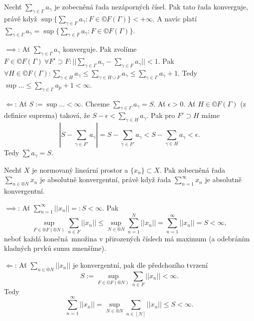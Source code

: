 \documentclass[12pt]{article}					%
\begin{document}
\begin{tvrzeni}
	Nechť $\sum_{\gamma \in \Gamma} a_\gamma$ je zobecněná řada nezáporných čísel. Pak tato řada konverguje, právě když $\sup\{\sum_{\gamma \in F} a_\gamma: F \in ©F(\Gamma)\} < +∞$. A navíc platí $\sum_{\gamma \in \Gamma} a_\gamma = \sup\{\sum_{\gamma \in F} a_\gamma: F \in ©F(\Gamma)\}$.

	\begin{dukazin}
		$\implies$: Ať $\sum_{\gamma \in \Gamma} a_\gamma$ konverguje. Pak zvolíme $F \in ©F(\Gamma)\ \forall F' \supset F: ||\sum_{\gamma \in \Gamma} a_\gamma - \sum_{\gamma \in F} a_\gamma|| < 1$.
		Pak $\forall H \in ©F(\Gamma): \sum_{\gamma \in H} a_\gamma ≤ \sum_{\gamma \in H \cup F} a_\gamma ≤ \sum_{\gamma \in \Gamma}a_\gamma + 1.$ Tedy $\sup… ≤ \sum_{\gamma \in \Gamma} a_p + 1 < ∞$.

		$\Leftarrow$: Ať $S:= \sup… < ∞$. Chceme $\sum_{\gamma \in \Gamma} a_\gamma = S$. Ať $\epsilon > 0$. Ať $H \in ©F(\Gamma)$ (z definice suprema) taková, že $S - \epsilon < \sum_{\gamma \in H} a_\gamma$. Pak pro $F' \supset H$ máme
		$$ |S - \sum_{\gamma \in F'} a_\gamma| = S - \sum_{\gamma \in F'} a_\gamma < S - \sum_{\gamma \in H}a_\gamma < \epsilon. $$
		Tedy $\sum a_\gamma = S$.
	\end{dukazin}
\end{tvrzeni}


\begin{tvrzeni}
	Nechť $X$ je normovaný lineární prostor a $\{x_n\} \subset X$. Pak zobecněná řada $\sum_{n \in ®N}x_n$ je absolutně konvergentní, právě když řada $\sum_{n=1}^∞ x_n$ je absolutně konvergentní.

	\begin{dukazin}
		$\implies$: Ať $\sum_{n=1}^∞ ||x_n|| =: S < ∞$. Pak
		$$ \sup_{F \in ®F(®N)} \sum_{n \in F} ||x_n|| ≤ \sup_{N \in ®N} \sum_{n=1}^N ||x_n|| = \sum_{n=1}^∞ ||x_n|| = S < ∞, $$
		neboť každá konečná množina v přirozených číslech má maximum (a odebráním kladných prvků sumu zmenšíme).

		$\Leftarrow$: Ať $\sum_{n \in ®N} ||x_n||$ je konvergentní, pak dle předchozího tvrzení
		$$ S:=\sup_{F \in ©F(®N)} \sum_{n \in F} ||x_n|| < ∞. $$
		Tedy
		$$ \sum_{n=1}^∞||x_n|| = \sup_{N \in ®N} \sum_{n \in [N]} ||x_n|| ≤ S < ∞. $$
	\end{dukazin}
\end{tvrzeni}
\end{document}
